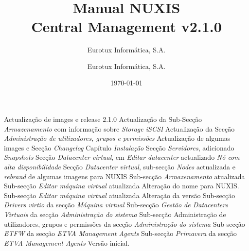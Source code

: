 \documentclass[12pt,a4paper,portuges]{scrreprt}
\author{Eurotux Informática, S.A.}
\title{Manual NUXIS\\ Central Management v2.1.0}
\subtitle{Eurotux Informática, S.A.}
\date{\today}
\begin{document}
\maketitle

\begin{Log}
Actualização de images e release 2.1.0
Actualização da Sub-Secção \textit{Armazenamento} com informação sobre \emph{Storage iSCSI}
Actualização da Secção \textit{Administração de utilizadores, grupos e permissões}
Actualização de algumas images e Secção \textit{Changelog}
Capítulo \textit{Instalação}
Secção \textit{Servidores}, adicionado \textit{Snapshots}
Secção \textit{Datacenter virtual}, em \textit{Editar datacenter} actualizado \textit{Nó com alta disponibilidade }
Secção \textit{Datacenter virtual}, sub-secção \textit{Nodes} actualizada e \textit{rebrand} de algumas imagens para NUXIS
Sub-secção \textit{Armazenamento} atualizada
Sub-secção \textit{Editar máquina virtual} atualizada
Alteração do nome para NUXIS. Sub-secção \textit{Editar máquina virtual} atualizada
Alteração da versão
Sub-secção \textit{Drivers virtio} da secção \textit{Máquina virtual}
Sub-secção \textit{Gestão de Datacenters Virtuais} da secção \textit{Administração do sistema}
Sub-secção Administração de utilizadores, grupos e permissões da secção \textit{Administração do sistema}
Sub-secção \textit{ETFW} da secção \textit{ETVA Management Agents}
Sub-secção \textit{Primavera} da secção \textit{ETVA Management Agents}
Versão inicial.
\end{Log}

\tableofcontents

\listoffigures


%
%


%


\end{document}
